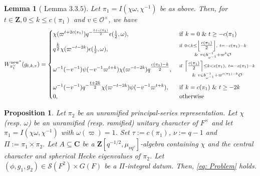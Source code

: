 \documentclass{amsart}
\theoremstyle{plain}
\newtheorem{lem}[thm]{Lemma}
\newtheorem{prop}[thm]{Proposition}
\theoremstyle{plain}
\theoremstyle{remark}
\begin{document}
\begin{lem}[\cite{Assing_2019} Lemma $3.3.5$]\label{prop Assing half-ramified princ series}
Let $\pi_1=I(\chi\omega,\chi^{-1})$ be as above. Then, for $t\in\mathbf{Z},0\leq k\leq c(\pi_1)$ and $v\in\mathcal{O}^\times$, we have
    \begin{align*}
        W_{\pi_1^\vee}^{\mathrm{new}^*}(g_{t,k,v})=\begin{dcases}
            \chi(\varpi^{t+2c(\pi_1)})q^{-\frac{t+c(\pi_1)}{2}}\epsilon(\tfrac{1}{2},\omega),\ &{\mathrm{if}\ k=0\ \&\ t\geq -c(\pi_1)}\\
            q^{\tfrac{k}{2}}\chi(\varpi^{-t-2k})\epsilon(\tfrac{1}{2},\omega),\ &\substack{\mathrm{if}\ 0<k\leq \left\lfloor \tfrac{c(\pi_1)}{2}\right\rfloor, \ t=-c(\pi_1)-k \\ \&\  v\in b_{\omega^{-1}}^{-1}+\varpi^k\mathcal{O}}\\
            \omega^{-1}(-v^{-1})\psi(-v^{-1}\varpi^{t+k})\chi(\varpi^{-t-2k})q^{\tfrac{c(\pi_1)-k}{2}},\ &\substack{\mathrm{if}\ \left\lceil \tfrac{c(\pi_1)}{2}\right\rceil \leq k< c(\pi_1),\ t=-c(\pi_1)-k\\ \&\ v\in b_{\omega^{-1}}^{-1}+\varpi^{c(\pi_1)-k}\mathcal{O}}\\
            \omega^{-1}(-v^{-1})q^{-\tfrac{t+2k}{2}}\chi(\varpi^{-t-2k})\psi(-v^{-1}\varpi^{t+k}),\ &{\mathrm{if}\ k= c(\pi_1)\ \&\ t\geq -2k}\\
            0,\ &\mathrm{otherwise}
        \end{dcases}
    \end{align*}

\end{lem}
\begin{prop}\label{thm tamely ram p.s + unr p.s}
    Let $\pi_2$ be an unramified principal-series representation. Let $\chi$ (resp. $\omega$) be an unramified (resp. ramified) unitary character of $F^\times$ and let $\pi_1=I(\chi\omega,\chi^{-1})$ with $\omega(\varpi)=1$. Set $\tau:=c(\pi_1)$, $\nu:=q-1$ and $\Pi:=\pi_1\times\pi_2$. Let $A\subseteq\mathbf{C}$ be a $\mathbf{Z}[q^{-1/2},\mu_{\nu q^\tau}]$-algebra containing $\chi$ and the central character and spherical Hecke eigenvalues of $\pi_2$. Let $(\phi,g_1,g_2)\in\mathcal{S}(F^2)\times G(F)$ be a $\Pi$-integral datum. Then, \eqref{eq: Problem} holds.
\end{prop}
\end{document}
